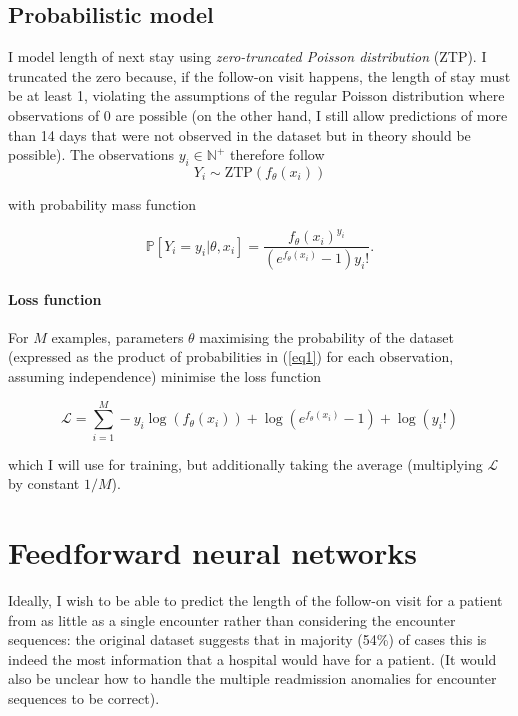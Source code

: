 \documentclass[10pt, twocolumn]{article}
\begin{document}
\subsection{Probabilistic model}
I model length of next stay using \textit{zero-truncated Poisson distribution} (ZTP). I truncated the zero because, if the follow-on visit happens, the length of stay must be at least 1, violating the assumptions of the regular Poisson distribution where observations of 0 are possible (on the other hand, I still allow predictions of more than 14 days that were not observed in the dataset but in theory should be possible). The observations $y_i \in \mathbb{N}^+$ therefore follow \[Y_i \sim \mathrm{ZTP}(f_\theta(x_i))\]

with probability mass function 

\begin{equation}
	\mathbb{P}[Y_i = y_i | \theta, x_i] = \frac{f_\theta(x_i)^{y_i}}{(e^{f_\theta(x_i)} - 1)y_i!}.
	\label{eq1}
\end{equation}

\paragraph{Loss function} For $M$ examples, parameters $\theta$ maximising the probability of the dataset (expressed as the product of probabilities in (\ref{eq1}) for each observation, assuming independence) minimise the loss function

\begin{equation}
	\mathcal{L} = \sum\limits_{i=1}^{M} -y_i \log(f_\theta(x_i)) + \log(e^{f_\theta(x_i)} - 1) + \log(y_i!)
\end{equation}

which I will use for training, but additionally taking the average (multiplying $\mathcal{L}$ by constant $1/M$).



\section{Feedforward neural networks}
Ideally, I wish to be able to predict the length of the follow-on visit for a patient from as little as a single encounter rather than considering the encounter sequences: the original dataset suggests that in majority (54\%) of cases this is indeed the most information that a hospital would have for a patient. (It would also be unclear how to handle the multiple readmission anomalies for encounter sequences to be correct).
\end{document}
